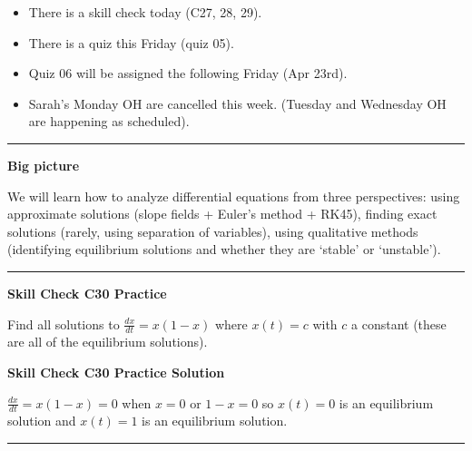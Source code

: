 \documentclass[12pt,letterpaper,noanswers]{exam}
\begin{document}
 \pdfpageheight 11in 
  \pdfpagewidth 8.5in





\begin{itemize}
\itemsep0em
\item There is a skill check today (C27, 28, 29).  
\item There is a quiz this Friday (quiz 05).
\item Quiz 06 will be assigned the following Friday (Apr 23rd).
\item Sarah's Monday OH are cancelled this week.  (Tuesday and Wednesday OH are happening as scheduled).
\end{itemize}

\hrule
\vspace{0.2cm}


\noindent\textbf{Big picture}

We will learn how to analyze differential equations from three perspectives: using approximate solutions (slope fields + Euler's method + RK45), finding exact solutions (rarely, using separation of variables), using qualitative methods (identifying equilibrium solutions and whether they are `stable' or `unstable').

\vspace{0.2cm}
\hrule
\vspace{0.2cm}



\noindent\textbf{Skill Check C30 Practice}
\begin{questions}
\item Find all solutions to $\frac{dx}{dt} = x(1-x)$ where $x(t) = c$ with $c$ a constant (these are all of the equilibrium solutions).

\end{questions}

\noindent\textbf{Skill Check C30 Practice Solution}
\begin{questions}
\item $\frac{dx}{dt} = x(1-x) = 0$ when $ x = 0 $ or $1 - x = 0$ so $x(t) = 0$ is an equilibrium solution and $x(t) = 1$ is an equilibrium solution.
\end{questions}
\vspace{0.2cm}
\hrule
\vspace{0.2cm}
\end{document}
